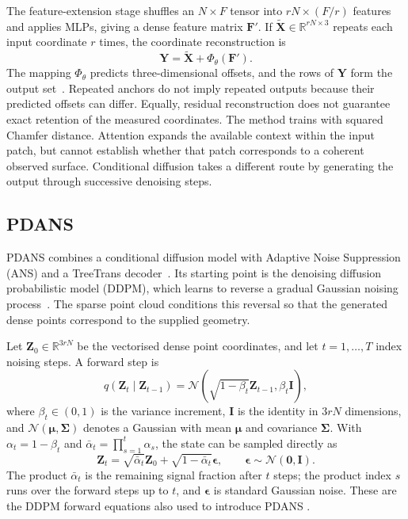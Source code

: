 The feature-extension stage shuffles an $N\times F$ tensor into
$rN\times(F/r)$ features and applies MLPs, giving a dense feature matrix
$\mathbf F'$. If $\tilde{\mathbf X}\in\mathbb R^{rN\times3}$ repeats
each input coordinate $r$ times, the coordinate reconstruction is
\begin{equation}
 \mathbf Y=\tilde{\mathbf X}+\Phi_\theta(\mathbf F').
 \label{eq:edgeformer_reconstruction}
\end{equation}
The mapping $\Phi_\theta$ predicts three-dimensional offsets, and the rows
of $\mathbf Y$ form the output set~\cite{kim2023puedgeformer}. Repeated
anchors do not imply repeated outputs because their predicted offsets can
differ. Equally, residual reconstruction does not guarantee exact retention
of the measured coordinates. The method trains with squared Chamfer
distance. Attention expands the available context within the input patch,
but cannot establish whether that patch corresponds to a coherent observed
surface. Conditional diffusion takes a different route by generating the
output through successive denoising steps.

\subsection{PDANS}
\label{subsec:pdans}

PDANS combines a conditional diffusion model with Adaptive Noise
Suppression (ANS) and a TreeTrans decoder~\cite{zhang2025pdans}. Its starting
point is the denoising diffusion probabilistic model (DDPM), which learns
to reverse a gradual Gaussian noising process~\cite{ho2020ddpm}. The
sparse point cloud conditions this reversal so that the generated dense
points correspond to the supplied geometry.

Let $\mathbf Z_0\in\mathbb R^{3rN}$ be the vectorised dense point
coordinates, and let $t=1,\ldots,T$ index noising steps. A forward step is
\begin{equation}
 q(\mathbf Z_t\mid\mathbf Z_{t-1})=
 \mathcal N(\sqrt{1-\beta_t}\mathbf Z_{t-1},\beta_t\mathbf I),
 \label{eq:diffusion_forward}
\end{equation}
where $\beta_t\in(0,1)$ is the variance increment, $\mathbf I$ is the
identity in $3rN$ dimensions, and $\mathcal N(\boldsymbol\mu,\boldsymbol\Sigma)$
denotes a Gaussian with mean $\boldsymbol\mu$ and covariance
$\boldsymbol\Sigma$. With $\alpha_t=1-\beta_t$ and
$\bar\alpha_t=\prod_{s=1}^t\alpha_s$, the state can be sampled directly as
\begin{equation}
 \mathbf Z_t=\sqrt{\bar\alpha_t}\mathbf Z_0+
 \sqrt{1-\bar\alpha_t}\boldsymbol\epsilon,
 \qquad\boldsymbol\epsilon\sim\mathcal N(\mathbf0,\mathbf I).
 \label{eq:diffusion_direct}
\end{equation}
The product $\bar\alpha_t$ is the remaining signal fraction after $t$
steps; the product index $s$ runs over the forward steps up to $t$,
and $\boldsymbol\epsilon$ is standard Gaussian noise. These are the
DDPM forward equations also used to introduce PDANS
\cite{zhang2025pdans,ho2020ddpm}.

